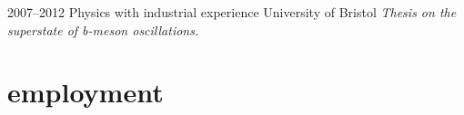 \documentclass[]{friggeri-cv} %
\begin{document}
\begin{entrylist}
\entry
{2007--2012}
{Physics {\normalfont with industrial experience}}
{University of Bristol}
{\emph{Thesis on the superstate of b-meson oscillations.} }
\end{entrylist}


\section{employment}
\end{document}

